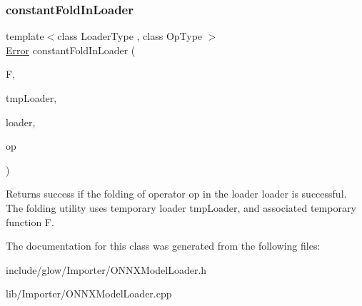 \subsubsection{\texorpdfstring{constant\+Fold\+In\+Loader}{constantFoldInLoader}}
{\footnotesize\ttfamily template$<$class Loader\+Type , class Op\+Type $>$ \\
\hyperlink{namespaceglow_afdb176c3a672ef66db0ecfc19a8d39bf}{Error} constant\+Fold\+In\+Loader (\begin{DoxyParamCaption}\item[{\hyperlink{classglow_1_1_function}{Function} $\ast$}]{F,  }\item[{Loader\+Type \&}]{tmp\+Loader,  }\item[{Loader\+Type $\ast$}]{loader,  }\item[{const Op\+Type \&}]{op }\end{DoxyParamCaption})\hspace{0.3cm}{\ttfamily [friend]}}

\begin{DoxyReturn}{Returns}
success if the folding of operator {\ttfamily op} in the loader {\ttfamily loader} is successful. The folding utility uses temporary loader {\ttfamily tmp\+Loader}, and associated temporary function {\ttfamily F}. 
\end{DoxyReturn}


The documentation for this class was generated from the following files\+:\begin{DoxyCompactItemize}
\item 
include/glow/\+Importer/O\+N\+N\+X\+Model\+Loader.\+h\item 
lib/\+Importer/O\+N\+N\+X\+Model\+Loader.\+cpp\end{DoxyCompactItemize}
